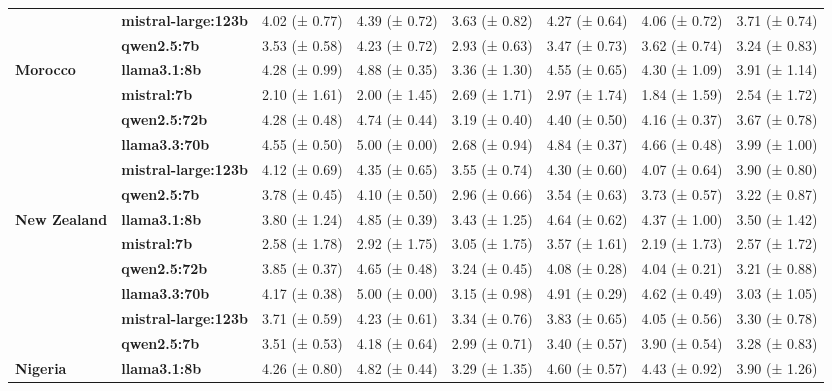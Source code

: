\begin{tabular}{llllllll}
\textbf{} & \textbf{mistral-large:123b} & 4.02 (± 0.77) & 4.39 (± 0.72) & 3.63 (± 0.82) & 4.27 (± 0.64) & 4.06 (± 0.72) & 3.71 (± 0.74) \\
\textbf{} & \textbf{qwen2.5:7b} & 3.53 (± 0.58) & 4.23 (± 0.72) & 2.93 (± 0.63) & 3.47 (± 0.73) & 3.62 (± 0.74) & 3.24 (± 0.83) \\
\cline{1-8}
\multirow[t]{6}{*}{\textbf{Morocco}} & \textbf{llama3.1:8b} & 4.28 (± 0.99) & 4.88 (± 0.35) & 3.36 (± 1.30) & 4.55 (± 0.65) & 4.30 (± 1.09) & 3.91 (± 1.14) \\
\textbf{} & \textbf{mistral:7b} & 2.10 (± 1.61) & 2.00 (± 1.45) & 2.69 (± 1.71) & 2.97 (± 1.74) & 1.84 (± 1.59) & 2.54 (± 1.72) \\
\textbf{} & \textbf{qwen2.5:72b} & 4.28 (± 0.48) & 4.74 (± 0.44) & 3.19 (± 0.40) & 4.40 (± 0.50) & 4.16 (± 0.37) & 3.67 (± 0.78) \\
\textbf{} & \textbf{llama3.3:70b} & 4.55 (± 0.50) & 5.00 (± 0.00) & 2.68 (± 0.94) & 4.84 (± 0.37) & 4.66 (± 0.48) & 3.99 (± 1.00) \\
\textbf{} & \textbf{mistral-large:123b} & 4.12 (± 0.69) & 4.35 (± 0.65) & 3.55 (± 0.74) & 4.30 (± 0.60) & 4.07 (± 0.64) & 3.90 (± 0.80) \\
\textbf{} & \textbf{qwen2.5:7b} & 3.78 (± 0.45) & 4.10 (± 0.50) & 2.96 (± 0.66) & 3.54 (± 0.63) & 3.73 (± 0.57) & 3.22 (± 0.87) \\
\cline{1-8}
\multirow[t]{6}{*}{\textbf{New Zealand}} & \textbf{llama3.1:8b} & 3.80 (± 1.24) & 4.85 (± 0.39) & 3.43 (± 1.25) & 4.64 (± 0.62) & 4.37 (± 1.00) & 3.50 (± 1.42) \\
\textbf{} & \textbf{mistral:7b} & 2.58 (± 1.78) & 2.92 (± 1.75) & 3.05 (± 1.75) & 3.57 (± 1.61) & 2.19 (± 1.73) & 2.57 (± 1.72) \\
\textbf{} & \textbf{qwen2.5:72b} & 3.85 (± 0.37) & 4.65 (± 0.48) & 3.24 (± 0.45) & 4.08 (± 0.28) & 4.04 (± 0.21) & 3.21 (± 0.88) \\
\textbf{} & \textbf{llama3.3:70b} & 4.17 (± 0.38) & 5.00 (± 0.00) & 3.15 (± 0.98) & 4.91 (± 0.29) & 4.62 (± 0.49) & 3.03 (± 1.05) \\
\textbf{} & \textbf{mistral-large:123b} & 3.71 (± 0.59) & 4.23 (± 0.61) & 3.34 (± 0.76) & 3.83 (± 0.65) & 4.05 (± 0.56) & 3.30 (± 0.78) \\
\textbf{} & \textbf{qwen2.5:7b} & 3.51 (± 0.53) & 4.18 (± 0.64) & 2.99 (± 0.71) & 3.40 (± 0.57) & 3.90 (± 0.54) & 3.28 (± 0.83) \\
\cline{1-8}
\multirow[t]{6}{*}{\textbf{Nigeria}} & \textbf{llama3.1:8b} & 4.26 (± 0.80) & 4.82 (± 0.44) & 3.29 (± 1.35) & 4.60 (± 0.57) & 4.43 (± 0.92) & 3.90 (± 1.26) \\

\end{tabular}
